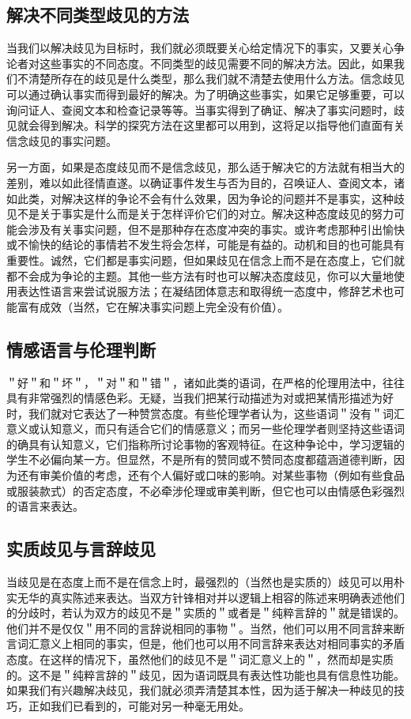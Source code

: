 \subsection{解决不同类型歧见的方法}

当我们以解决歧见为目标时，我们就必须既要关心给定情况下的事实，又要关心争论者对这些事实的不同态度。不同类型的歧见需要不同的解决方法。因此，如果我们不清楚所存在的歧见是什么类型，那么我们就不清楚去使用什么方法。信念歧见可以通过确认事实而得到最好的解决。为了明确这些事实，如果它足够重要，可以询问证人、查阅文本和检查记录等等。当事实得到了确证、解决了事实问题时，歧见就会得到解决。科学的探究方法在这里都可以用到，这将足以指导他们直面有关信念歧见的事实问题。

另一方面，如果是态度歧见而不是信念歧见，那么适于解决它的方法就有相当大的差别，难以如此径情直遂。以确证事件发生与否为目的，召唤证人、查阅文本，诸如此类，对解决这样的争论不会有什么效果，因为争论的问题并不是事实，这种歧见不是关于事实是什么而是关于怎样评价它们的对立。解决这种态度歧见的努力可能会涉及有关事实问题，但不是那种存在态度冲突的事实。或许考虑那种引出愉快或不愉快的结论的事情若不发生将会怎样，可能是有益的。动机和目的也可能具有重要性。诚然，它们都是事实问题，但如果歧见在信念上而不是在态度上，它们就都不会成为争论的主题。其他一些方法有时也可以解决态度歧见，你可以大量地使用表达性语言来尝试说服方法；在凝结团体意志和取得统一态度中，修辞艺术也可能富有成效（当然，它在解决事实问题上完全没有价值）。

\subsection{情感语言与伦理判断}

＂好＂和＂坏＂，＂对＂和＂错＂，诸如此类的语词，在严格的伦理用法中，往往具有非常强烈的情感色彩。无疑，当我们把某行动描述为对或把某情形描述为好时，我们就对它表达了一种赞赏态度。有些伦理学者认为，这些语词＂没有＂词汇意义或认知意义，而只有适合它们的情感意义；而另一些伦理学者则坚持这些语词的确具有认知意义，它们指称所讨论事物的客观特征。在这种争论中，学习逻辑的学生不必偏向某一方。但显然，不是所有的赞同或不赞同态度都蕴涵道德判断，因为还有审美价值的考虑，还有个人偏好或口味的影响。对某些事物（例如有些食品或服装款式）的否定态度，不必牵涉伦理或审美判断，但它也可以由情感色彩强烈的语言来表达。

\subsection{实质歧见与言辞歧见}

当歧见是在态度上而不是在信念上时，最强烈的（当然也是实质的）歧见可以用朴实无华的真实陈述来表达。当双方针锋相对并以逻辑上相容的陈述来明确表述他们的分歧时，若认为双方的歧见不是＂实质的＂或者是＂纯粹言辞的＂就是错误的。他们并不是仅仅＂用不同的言辞说相同的事物＂。当然，他们可以用不同言辞来断言词汇意义上相同的事实，但是，他们也可以用不同言辞来表达对相同事实的矛盾态度。在这样的情况下，虽然他们的歧见不是＂词汇意义上的＂，然而却是实质的。这不是＂纯粹言辞的＂歧见，因为语词既具有表达性功能也具有信息性功能。如果我们有兴趣解决歧见，我们就必须弄清楚其本性，因为适于解决一种歧见的技巧，正如我们已看到的，可能对另一种毫无用处。

